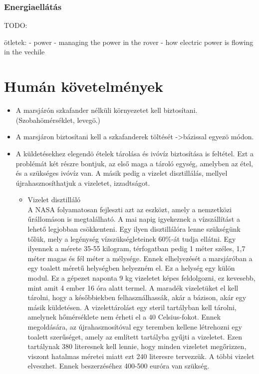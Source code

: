 \documentclass[12pt]{report}
\begin{document}
\subsubsection{Energiaellátás}

TODO:

ötletek:
- power
  - managing the power in the rover
  - how electric power is flowing in the vechile

\section{Humán követelmények}
\begin{itemize}
  \item A marsjárón szkafander nélküli környezetet kell biztosítani. (Szobahömérséklet, levegö.)
  \item A marsjáron biztosítani kell a szkafanderek töltését ->bázissal egyezö módon.
  \item A küldetésekhez elegendö ételek tárolása és ivóvíz biztosítása is feltétel.
  Ezt a problémát két részre bontjuk, az első maga a tároló egység, amelyben az étel, és a szükséges ivóvíz van. A másik pedig a vizelet disztillálás, mellyel újrahasznosíthatjuk a vizeletet, izzadtságot.
  \begin{itemize}
    \item Vizelet disztilláló \\
    A NASA folyamatosan fejleszti azt az eszközt, amely a nemzetközi űrállomáson is megtalálható. A mai napig igyekeznek a vízszállítást a lehető legjobban csökkenteni. Egy ilyen disztillálóra lenne szükségünk tőlük, mely a legénység vízszükségleteinek 60\%-át tudja ellátni.
    Egy ilyennek a mérete 35-55 kilogram, térfogatban pedig 1 méter széles, 1,7 méter magas és fél méter a mélysége.
    Ennek elhelyezését a marsjáróban a egy toalett méretű helységben helyezném el. Ez a helység egy külön modul.
    Ez a gépezet naponta 9 kg vizeletet képes feldolgozni, ez kevesebb, mint amit 4 ember 16 óra alatt termel. A maradék vizeletüket el kell tárolni, hogy a későbbiekben felhasználhassák, akár a bázison, akár egy másik küldetésen. A vizelettárolást egy steril tartályban kell tárolni, amelynek hőmérséklete nem érheti el a 40 Celsius-fokot. Ennek megoldására, az újrahasznosítóval egy teremben kellene létrehozni egy toalett szerűséget, amely az említett tartályba gyűjti a vizeletet. Ezen tartálynak 380 literesnek kell lennie, hogy minden vizeletet megőrizzen, viszont hatalmas méretei miatt ezt 240 literesre tervezzük. A többi vizelet elveszhet. Ennek beszerzéséhez 400-500 euróra van szükség.

\end{itemize}
\end{itemize}
\end{document}

